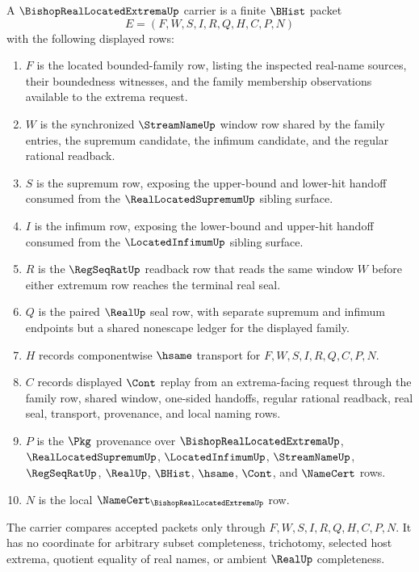 \begin{definition}
\label{def:bishop-real-located-extrema-carrier}
A $\BishopRealLocatedExtremaUp$ carrier is a finite $\BHist$ packet
$$
E=(F,W,S,I,R,Q,H,C,P,N)
$$
with the following displayed rows:
\begin{enumerate}
\item $F$ is the located bounded-family row, listing the inspected real-name sources, their boundedness witnesses, and the family membership observations available to the extrema request.
\item $W$ is the synchronized $\StreamNameUp$ window row shared by the family entries, the supremum candidate, the infimum candidate, and the regular rational readback.
\item $S$ is the supremum row, exposing the upper-bound and lower-hit handoff consumed from the $\RealLocatedSupremumUp$ sibling surface.
\item $I$ is the infimum row, exposing the lower-bound and upper-hit handoff consumed from the $\LocatedInfimumUp$ sibling surface.
\item $R$ is the $\RegSeqRatUp$ readback row that reads the same window $W$ before either extremum row reaches the terminal real seal.
\item $Q$ is the paired $\RealUp$ seal row, with separate supremum and infimum endpoints but a shared nonescape ledger for the displayed family.
\item $H$ records componentwise $\hsame$ transport for $F,W,S,I,R,Q,C,P,N$.
\item $C$ records displayed $\Cont$ replay from an extrema-facing request through the family row, shared window, one-sided handoffs, regular rational readback, real seal, transport, provenance, and local naming rows.
\item $P$ is the $\Pkg$ provenance over $\BishopRealLocatedExtremaUp$, $\RealLocatedSupremumUp$, $\LocatedInfimumUp$, $\StreamNameUp$, $\RegSeqRatUp$, $\RealUp$, $\BHist$, $\hsame$, $\Cont$, and $\NameCert$ rows.
\item $N$ is the local $\NameCert_{\BishopRealLocatedExtremaUp}$ row.
\end{enumerate}
The carrier compares accepted packets only through $F,W,S,I,R,Q,H,C,P,N$. It has no coordinate for arbitrary subset completeness, trichotomy, selected host extrema, quotient equality of real names, or ambient $\RealUp$ completeness.
\end{definition}


